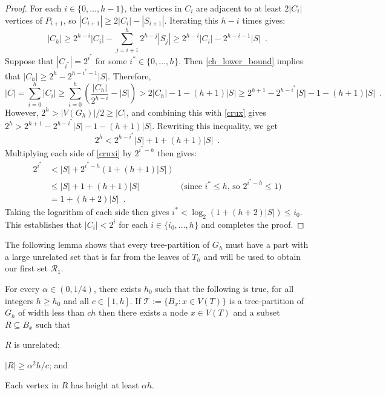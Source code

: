 \documentclass{patmorin}
\renewcommand{\le}{\leqslant}
\renewcommand{\ge}{\geqslant}
\begin{document}
\begin{proof}
  For each $i\in\{0,\ldots,h-1\}$, the vertices in $C_i$ are adjacent to at least $2|C_i|$ vertices of $P_{i+1}$, so $|C_{i+1}|\ge 2|C_i|-|S_{i+1}|$.  Iterating this $h-i$ times gives:
  \begin{equation}
    |C_h| \ge 2^{h-i}|C_i| - \sum_{j=i+1}^h 2^{h-j}|S_j| \ge 2^{h-i}|C_i| - 2^{h-i-1}|S| \enspace . \label{ch_lower_bound}
  \end{equation}
  Suppose that $|C_{i^*}|=2^{i^*}$ for some $i^*\in\{0,\ldots,h\}$. Then \cref{ch_lower_bound} implies that $|C_h|\ge 2^h-2^{h-i^*-1}|S|$.  Therefore,
  \begin{equation}
      |C|
         =\sum_{i=0}^h |C_i| \ge \sum_{i=0}^h\left(\frac{|C_h|}{2^{h-i}} - |S|\right)
       > 2|C_h| - 1 -(h+1)|S|
       \ge 2^{h+1}-2^{h-i^*}|S|-1 - (h+1)|S| \enspace .  \label{crux}
  \end{equation}
  However, $2^h > |V(G_h)|/2 \ge |C|$, and combining this with \cref{crux} gives $2^h > 2^{h+1} - 2^{h-i^*}|S|-1-(h+1)|S|$.
  Rewriting this inequality, we get
  \begin{equation}
     2^h < 2^{h-i^*}|S|+ 1 + (h+1)|S| \enspace . \label{cruxi}
  \end{equation}
  Multiplying each side of \cref{cruxi} by $2^{i^*-h}$ then gives:
  \begin{align*}
    2^{i^*} & <  |S| + 2^{i^*-h}(1+(h+1)|S|) \\
            & \le |S| + 1 + (h+1)|S| & \text{(since $i^*\le h$, so $2^{i^*-h}\le 1$)} \\
            & = 1+ (h+2)|S| \enspace .
  \end{align*}
  Taking the logarithm of each side then gives $i^* < \log_2(1+(h+2)|S|)\le i_0$.  This establishes that $|C_i|< 2^i$ for each $i\in\{i_0,\ldots,h\}$ and  completes the proof.
\end{proof}

The following lemma shows that every tree-partition of $G_h$ must have a part with a large unrelated set that is far from the leaves of $T_h$ and will be used to obtain our first set $\mathcal{R}_1$.

\begin{lem}\label{startup}
  For every $\alpha\in(0,1/4)$, there exists $h_0$ such that the following is true, for all integers $h\ge  h_0$ and all $c\in[1,h]$.  If $\mathcal{T}:=\{B_x:x\in V(T)\}$ is a tree-partition of $G_h$ of width less than $ch$ then there exists a node $x\in V(T)$ and a subset $R\subseteq B_x$ such that
  \begin{compactenum}[(i)]
    \item $R$ is unrelated;
    \item $|R|\ge \alpha^2 h/c$; and
    \item Each vertex in $R$ has height at least $\alpha h$.
  \end{compactenum}
\end{lem}
\end{document}
